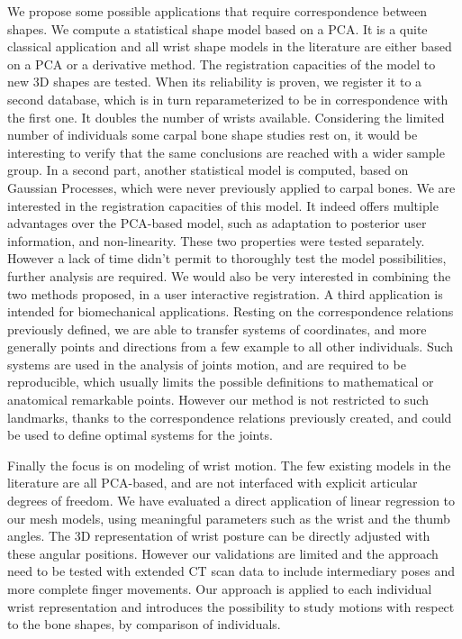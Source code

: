 \documentclass[../../Main.tex]{subfiles}
\begin{document}
We propose some possible applications that require correspondence between shapes. We compute a statistical shape model based on a PCA. It is a quite classical application and all wrist shape models in the literature are either based on a PCA or a derivative method. The registration capacities of the model to new 3D shapes are tested. When its reliability is proven, we register it to a second database, which is in turn reparameterized to be in correspondence with the first one. It doubles the number of wrists available. Considering the limited number of individuals some carpal bone shape studies rest on, it would be interesting to verify that the same conclusions are reached with a wider sample group. In a second part, another statistical model is computed, based on Gaussian Processes, which were never previously applied to carpal bones. We are interested in the registration capacities of this model. It indeed offers multiple advantages over the PCA-based model, such as adaptation to posterior user information, and non-linearity. These two properties were tested separately. However a lack of time didn't permit to thoroughly test the model possibilities, further analysis are required. We would also be very interested in combining the two methods proposed, in a user interactive registration. A third application is intended for biomechanical applications. Resting on the correspondence relations previously defined, we are able to transfer systems of coordinates, and more generally points and directions from a few example to all other individuals. Such systems are used in the analysis of joints motion, and are required to be reproducible, which usually limits the possible definitions to mathematical or anatomical remarkable points. However our method is not restricted to such landmarks, thanks to the correspondence relations previously created, and could be used to define optimal systems for the joints. 

 
Finally the focus is on modeling of wrist motion. The few existing models in the literature are all PCA-based, and are not interfaced with explicit articular degrees of freedom. We have evaluated a direct application of linear regression to our mesh models, using meaningful parameters such as the wrist and the thumb \fe* angles. The 3D representation of wrist posture can be directly adjusted with these angular positions. However our validations are limited and the approach need to be tested with extended CT scan data to include intermediary poses and more complete finger movements. Our approach is applied to each individual wrist representation and introduces the possibility to study motions with respect to the bone shapes, by comparison of individuals. 
\end{document}
